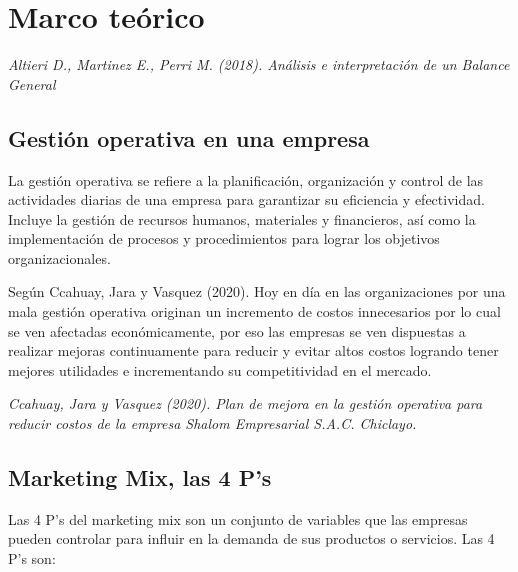 \documentclass{article}
\newenvironment{marcoTeorico}{\section{Marco teórico}}{}
\begin{document}
\begin{marcoTeorico}
\begin{flushright}
  \textit{Altieri D., Martinez E., Perri M. (2018). Análisis e interpretación de un Balance General}
\end{flushright}
\vspace{-0.5cm}
\subsection{Gestión operativa en una empresa}

La gestión operativa se refiere a la planificación, organización y control de las actividades diarias de una empresa para garantizar su eficiencia y efectividad. Incluye la gestión de recursos humanos, materiales y financieros, así como la implementación de procesos y procedimientos para lograr los objetivos organizacionales.

Según Ccahuay, Jara y Vasquez (2020). Hoy en día en las organizaciones por una mala gestión operativa originan un incremento de costos innecesarios por lo cual se ven afectadas económicamente, por eso las empresas se ven dispuestas a realizar mejoras continuamente para reducir y evitar altos costos logrando tener mejores utilidades e incrementando su competitividad en el mercado.

\begin{flushright}
  \textit{Ccahuay, Jara y Vasquez (2020). Plan de mejora en la gestión operativa para reducir costos de la
  empresa Shalom Empresarial S.A.C. Chiclayo.}
\end{flushright}



  \subsection{Marketing Mix, las 4 P's}

  Las 4 P's del marketing mix son un conjunto de variables que las empresas pueden controlar para influir en la demanda de sus productos o servicios. Las 4 P's son:
  

\end{marcoTeorico}
\end{document}
